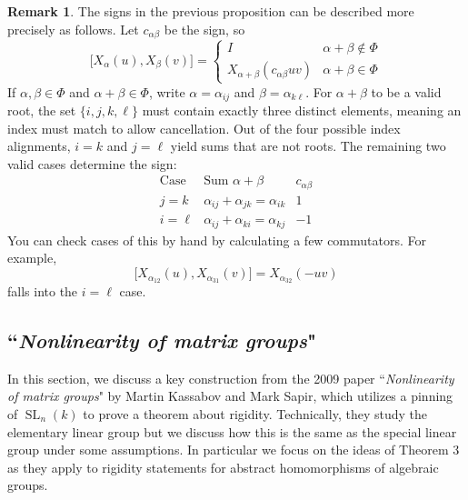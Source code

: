 \documentclass[12pt]{article}
\theoremstyle{definition}
\newtheorem{remark}[theorem]{Remark}
\DeclareMathOperator{\SL}{SL}
\begin{document}
\begin{remark}
The signs in the previous proposition can be described more precisely as follows. Let $c_{\alpha \beta}$ be the sign, so
\[
	\Big[ X_\alpha(u), X_\beta(v) \Big] =
	\begin{cases}
		I & \alpha+\beta \not \in \Phi \\
		X_{\alpha+\beta}( c_{\alpha \beta} uv) & \alpha+\beta \in \Phi
	\end{cases}
\]
If $\alpha, \beta \in \Phi$ and $\alpha+\beta \in \Phi$, write $\alpha = \alpha_{ij}$ and $\beta = \alpha_{k\ell}$. For $\alpha + \beta$ to be a valid root, the set $\{i, j, k, \ell\}$ must contain exactly three distinct elements, meaning an index must match to allow cancellation. Out of the four possible index alignments, $i = k$ and $j = \ell$ yield sums that are not roots. The remaining two valid cases determine the sign:
\[
	\begin{array}{l|c|r}
		\text{Case} & \text{Sum } \alpha+\beta & c_{\alpha \beta} \\
		\hline
		j = k & \alpha_{ij} + \alpha_{jk} = \alpha_{ik} & 1 \\
		i = \ell & \alpha_{ij} + \alpha_{ki} = \alpha_{kj} & -1
	\end{array}
\]
You can check cases of this by hand by calculating a few commutators. For example, 
\[
	\Big[ X_{\alpha_{12}}(u), X_{\alpha_{31}}(v) \Big] = X_{\alpha_{32}}(-uv)
\]
falls into the $i = \ell$ case.
\end{remark}

\subsection{``\textit{Nonlinearity of matrix groups}"}
\label{nonlinearity}

In this section, we discuss a key construction from the 2009 paper ``\textit{Nonlinearity of matrix groups}" by Martin Kassabov and Mark Sapir, which utilizes a pinning of $\SL_n(k)$ to prove a theorem about rigidity. Technically, they study the elementary linear group but we discuss how this is the same as the special linear group under some assumptions. In particular we focus on the ideas of Theorem 3 as they apply to rigidity statements for abstract homomorphisms of algebraic groups.
\end{document}
